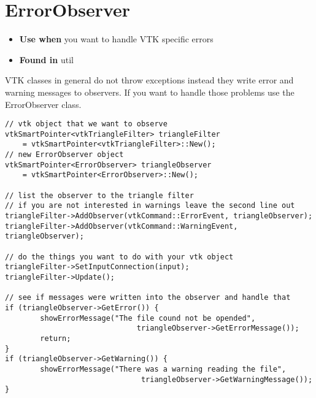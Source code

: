 \section{ErrorObserver}
\label{sec:ErrorObserver}

\begin{itemize}
	\item \textbf{Use when} you want to handle VTK specific errors
	\item \textbf{Found in} util
\end{itemize}

VTK classes in general do not throw exceptions instead they write error and warning messages to observers. If you want to handle those problems use the ErrorObserver class.

\begin{lstlisting}[style=lstStyleCpp]
// vtk object that we want to observe
vtkSmartPointer<vtkTriangleFilter> triangleFilter 
	= vtkSmartPointer<vtkTriangleFilter>::New();
// new ErrorObserver object
vtkSmartPointer<ErrorObserver> triangleObserver 
	= vtkSmartPointer<ErrorObserver>::New();

// list the observer to the triangle filter
// if you are not interested in warnings leave the second line out
triangleFilter->AddObserver(vtkCommand::ErrorEvent, triangleObserver);
triangleFilter->AddObserver(vtkCommand::WarningEvent, triangleObserver);

// do the things you want to do with your vtk object
triangleFilter->SetInputConnection(input);
triangleFilter->Update();

// see if messages were written into the observer and handle that
if (triangleObserver->GetError()) {
        showErrorMessage("The file cound not be opended", 
        				      triangleObserver->GetErrorMessage());
        return;
}
if (triangleObserver->GetWarning()) {
        showErrorMessage("There was a warning reading the file",
        				       triangleObserver->GetWarningMessage());
}
\end{lstlisting}
